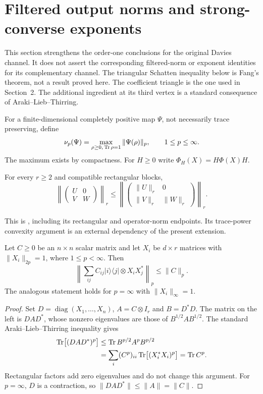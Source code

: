 \section{Filtered output norms and strong-converse exponents}\label{sec:renyi}
This section strengthens the order-one conclusions for the original Davies
channel. It does not assert the corresponding filtered-norm or exponent
identities for its complementary channel. The triangular Schatten inequality
below is Fang's theorem, not a result proved here. The coefficient triangle
is the one used in Section~2. The additional ingredient at its third vertex
is a standard consequence of Araki--Lieb--Thirring.

For a finite-dimensional completely positive map $\Psi$, not necessarily
trace preserving, define
\[
 \nu_p(\Psi)=\max_{\rho\ge0,\,\operatorname{Tr}\rho=1}\|\Psi(\rho)\|_p,
 \qquad 1\le p\le\infty.
\]
The maximum exists by compactness. For $H\ge0$ write
$\Phi_H(X)=H\Phi(X)H$.

\begin{lemma}\label{lem:fangnorm}
For every $r\ge2$ and compatible rectangular blocks,
\[
 \left\|\begin{pmatrix}U&0\\V&W\end{pmatrix}\right\|_r
 \le
 \left\|\begin{pmatrix}\|U\|_r&0\\\|V\|_r&\|W\|_r\end{pmatrix}\right\|_r.
\]
\end{lemma}
This is \cite[Theorem~3]{fang}, including its rectangular and operator-norm
endpoints. Its trace-power convexity argument is an external dependency of
the present extension.

\begin{lemma}\label{lem:altnorm}
Let $C\ge0$ be an $n\times n$ scalar matrix and let $X_i$ be $d\times r$
matrices with $\|X_i\|_{2p}=1$, where $1\le p<\infty$. Then
\[
 \left\|\sum_{ij}C_{ij}|i\rangle\langle j|\otimes X_iX_j^*\right\|_p
 \le\|C\|_p.
\]
The analogous statement holds for $p=\infty$ with $\|X_i\|_\infty=1$.
\end{lemma}
\begin{proof}
Set $D=\operatorname{diag}(X_1,\ldots,X_n)$,
$A=C\otimes I_r$ and $B=D^*D$. The matrix on the left is $DAD^*$,
whose nonzero eigenvalues are those of $B^{1/2}AB^{1/2}$. The standard
Araki--Lieb--Thirring inequality \cite[Theorem~1]{alt} gives
\begin{align*}
 \operatorname{Tr}\bigl[(DAD^*)^p\bigr]
 &\le\operatorname{Tr} B^{p/2}A^p B^{p/2}\\
 &=\sum_i(C^p)_{ii}\operatorname{Tr}\bigl[(X_i^*X_i)^p\bigr]=\operatorname{Tr} C^p.
\end{align*}
Rectangular factors add zero eigenvalues and do not change this argument.
For $p=\infty$, $D$ is a contraction, so $\|DAD^*\|\le\|A\|=\|C\|$.
\end{proof}

